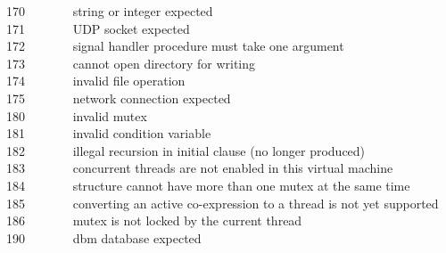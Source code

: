 170 \ \ \ \ \ \ \ string or integer expected\\
171 \ \ \ \ \ \ \ UDP socket expected\\
172 \ \ \ \ \ \ \ signal handler procedure must take one argument\\
173 \ \ \ \ \ \ \ cannot open directory for writing\\
174 \ \ \ \ \ \ \ invalid file operation\\
175 \ \ \ \ \ \ \ network connection expected\\
180 \ \ \ \ \ \ \ invalid mutex\\
181 \ \ \ \ \ \ \ invalid condition variable\\
182 \ \ \ \ \ \ \ illegal recursion in initial clause (no longer produced)\\
183 \ \ \ \ \ \ \ concurrent threads are not enabled in
this virtual machine\\
184 \ \ \ \ \ \ \ structure cannot have more than one mutex at 
the same time\\
185 \ \ \ \ \ \ \ converting an active co-expression to a thread
is not yet supported\\
186 \ \ \ \ \ \ \ mutex is not locked by the current thread\\
190 \ \ \ \ \ \ \ dbm database expected\\
